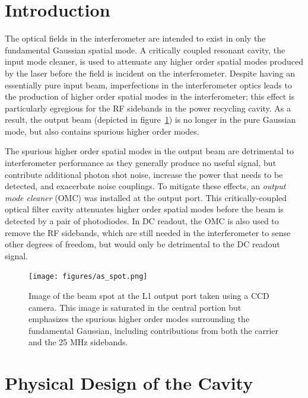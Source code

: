 \label{chapter4}
\section{Introduction}

The optical fields in the interferometer are intended to exist in only
the fundamental Gaussian spatial mode.  A critically coupled resonant
cavity, the input mode cleaner, is used to attenuate any higher order
spatial modes produced by the laser before the field is incident on
the interferometer.  Despite having an essentially pure input beam,
imperfections in the interferometer optics leads to the production of
higher order spatial modes in the interferometer; this effect is
particularly egregious for the RF sidebands in the power recycling
cavity\cite{Gretarsson2007Effects}.  As a result, the output beam
(depicted in figure~\ref{fig:as-spot}) is no longer in the pure
Gaussian mode, but also contains spurious higher order modes.

The spurious higher order spatial modes in the output beam are
detrimental to interferometer performance as they generally produce no
useful signal, but contribute additional photon shot noise, increase
the power that needs to be detected, and exacerbate noise couplings.
To mitigate these effects, an \emph{output mode cleaner} (OMC) was
installed at the output port.  This critically-coupled optical filter
cavity attenuates higher order spatial modes before the beam is
detected by a pair of photodiodes.  In DC readout, the OMC is also
used to remove the RF sidebands, which are still needed in the
interferometer to sense other degrees of freedom, but would only be
detrimental to the DC readout signal.

\begin{figure}[t]
\centerline{\texttt{[image: figures/as\_spot.png]}}
\caption[Beam spot at the interferometer output port]{
\label{fig:as-spot}Image of the beam spot at the L1 output
  port taken using a CCD camera.  This image is saturated in the
  central portion but emphasizes the spurious higher order modes
  surrounding the fundamental Gaussian, including contributions
  from both the carrier and the 25 MHz sidebands.}
\end{figure}

\section{Physical Design of the Cavity}


